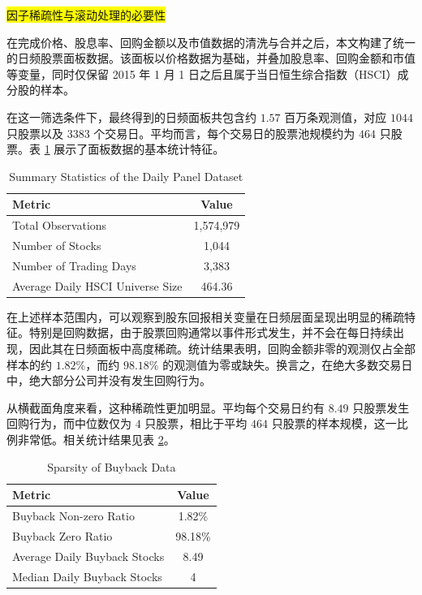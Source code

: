 \documentclass[a4paper,10pt]{article}
\begin{document}
\colorbox{yellow}{因子稀疏性与滚动处理的必要性}

在完成价格、股息率、回购金额以及市值数据的清洗与合并之后，本文构建了统一的日频股票面板数据。该面板以价格数据为基础，并叠加股息率、回购金额和市值等变量，同时仅保留 2015 年 1 月 1 日之后且属于当日恒生综合指数（HSCI）成分股的样本。

在这一筛选条件下，最终得到的日频面板共包含约 $1.57$ 百万条观测值，对应 $1044$ 只股票以及 $3383$ 个交易日。平均而言，每个交易日的股票池规模约为 $464$ 只股票。表 \ref{tab:panel_summary} 展示了面板数据的基本统计特征。

\begin{table}[H]
\centering
\caption{Summary Statistics of the Daily Panel Dataset}
\label{tab:panel_summary}
\begin{tabular}{lc}
\toprule
Metric & Value \\
\midrule
Total Observations & 1,574,979 \\
Number of Stocks & 1,044 \\
Number of Trading Days & 3,383 \\
Average Daily HSCI Universe Size & 464.36 \\
\bottomrule
\end{tabular}
\end{table}

在上述样本范围内，可以观察到股东回报相关变量在日频层面呈现出明显的稀疏特征。特别是回购数据，由于股票回购通常以事件形式发生，并不会在每日持续出现，因此其在日频面板中高度稀疏。统计结果表明，回购金额非零的观测仅占全部样本的约 $1.82\%$，而约 $98.18\%$ 的观测值为零或缺失。换言之，在绝大多数交易日中，绝大部分公司并没有发生回购行为。

从横截面角度来看，这种稀疏性更加明显。平均每个交易日约有 $8.49$ 只股票发生回购行为，而中位数仅为 $4$ 只股票，相比于平均 $464$ 只股票的样本规模，这一比例非常低。相关统计结果见表 \ref{tab:buyback_sparse}。

\begin{table}[H]
\centering
\caption{Sparsity of Buyback Data}
\label{tab:buyback_sparse}
\begin{tabular}{lc}
\toprule
Metric & Value \\
\midrule
Buyback Non-zero Ratio & 1.82\% \\
Buyback Zero Ratio & 98.18\% \\
Average Daily Buyback Stocks & 8.49 \\
Median Daily Buyback Stocks & 4 \\
\bottomrule
\end{tabular}
\end{table}
\end{document}
